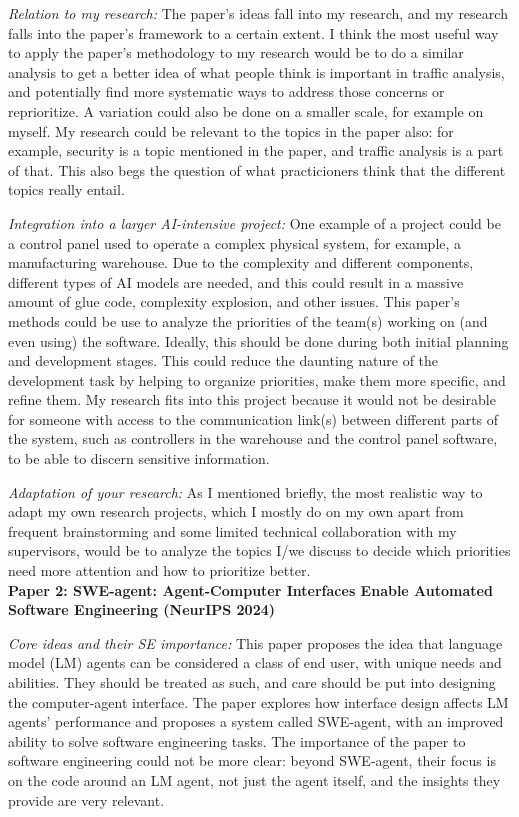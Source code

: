 \documentclass[11pt]{article}
\begin{document}
\textit{Relation to my research:} The paper's ideas fall into my research, and my research falls into the paper's framework to a certain extent. I think the most useful way to apply the paper's methodology to my research would be to do a similar analysis to get a better idea of what people think is important in traffic analysis, and potentially find more systematic ways to address those concerns or reprioritize. A variation could also be done on a smaller scale, for example on myself. My research could be relevant to the topics in the paper also: for example, security is a topic mentioned in the paper, and traffic analysis is a part of that. This also begs the question of what practicioners think that the different topics really entail.

\textit{Integration into a larger AI-intensive project:} One example of a project could be a control panel used to operate a complex physical system, for example, a manufacturing warehouse. Due to the complexity and different components, different types of AI models are needed, and this could result in a massive amount of glue code, complexity explosion, and other issues. This paper's methods could be use to analyze the priorities of the team(s) working on (and even using) the software. Ideally, this should be done during both initial planning and development stages. This could reduce the daunting nature of the development task by helping to organize priorities, make them more specific, and refine them. My research fits into this project because it would not be desirable for someone with access to the communication link(s) between different parts of the system, such as controllers in the warehouse and the control panel software, to be able to discern sensitive information.

\textit{Adaptation of your research:} As I mentioned briefly, the most realistic way to adapt my own research projects, which I mostly do on my own apart from frequent brainstorming and some limited technical collaboration with my supervisors, would be to analyze the topics I/we discuss to decide which priorities need more attention and how to prioritize better. \hfill \\

\noindent \textbf{Paper 2: SWE-agent: Agent-Computer Interfaces Enable Automated Software Engineering (NeurIPS 2024)}

\textit{Core ideas and their SE importance:} This paper proposes the idea that language model (LM) agents can be considered a class of end user, with unique needs and abilities. They should be treated as such, and care should be put into designing the computer-agent interface. The paper explores how interface design affects LM agents' performance and proposes a system called SWE-agent, with an improved ability to solve software engineering tasks. The importance of the paper to software engineering could not be more clear: beyond SWE-agent, their focus is on the code around an LM agent, not just the agent itself, and the insights they provide are very relevant.
\end{document}
